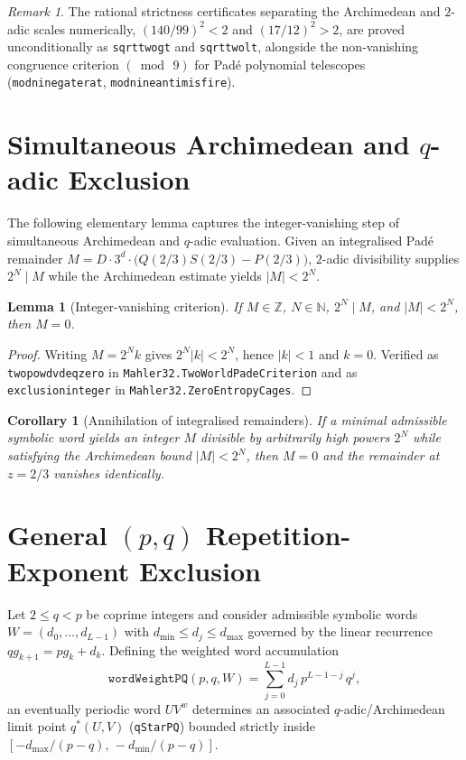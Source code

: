 \documentclass[11pt,a4paper]{article}
\newtheorem{lemma}[theorem]{Lemma}
\newtheorem{corollary}[theorem]{Corollary}
\theoremstyle{remark}
\newtheorem{remark}[theorem]{Remark}
\newcommand{\Z}{\mathbb{Z}}
\newcommand{\N}{\mathbb{N}}
\renewcommand{\_}{\textunderscore\allowbreak}
\newcommand{\lean}[1]{\texttt{#1}}
\begin{document}
\begin{remark}
The rational strictness certificates separating the Archimedean and $2$-adic scales numerically, $(140/99)^2<2$ and $(17/12)^2>2$, are proved unconditionally as \lean{sqrt\_two\_gt\_140\_99} and \lean{sqrt\_two\_lt\_17\_12}, alongside the non-vanishing congruence criterion $(\bmod\,9)$ for Pad\'e polynomial telescopes (\lean{mod\_nine\_gate\_rat}, \lean{mod\_nine\_anti\_misfire}).
\end{remark}

\section{Simultaneous Archimedean and \texorpdfstring{$q$}{q}-adic Exclusion}
\label{sec:engine}

The following elementary lemma captures the integer-vanishing step of simultaneous Archimedean and $q$-adic evaluation. Given an integralised Pad\'e remainder $M=D\cdot 3^{d}\cdot\bigl(Q(2/3)S(2/3)-P(2/3)\bigr)$, $2$-adic divisibility supplies $2^{N}\mid M$ while the Archimedean estimate yields $|M|<2^{N}$.

\begin{lemma}[Integer-vanishing criterion]
\label{lem:engine}
If $M\in\Z$, $N\in\N$, $2^{N}\mid M$, and $|M|<2^{N}$, then $M=0$.
\end{lemma}

\begin{proof}
Writing $M=2^{N}k$ gives $2^{N}|k|<2^{N}$, hence $|k|<1$ and $k=0$. Verified as \lean{two\_pow\_dvd\_eq\_zero} in \lean{Mahler32.\allowbreak TwoWorldPadeCriterion} and as \lean{exclusion\_integer} in \lean{Mahler32.\allowbreak ZeroEntropyCages}.
\end{proof}

\begin{corollary}[Annihilation of integralised remainders]
If a minimal admissible symbolic word yields an integer $M$ divisible by arbitrarily high powers $2^N$ while satisfying the Archimedean bound $|M|<2^N$, then $M=0$ and the remainder at $z=2/3$ vanishes identically.
\end{corollary}

\section{General \texorpdfstring{$(p,q)$}{(p,q)} Repetition-Exponent Exclusion}
\label{sec:pqbound}

Let $2\le q<p$ be coprime integers and consider admissible symbolic words $W=(d_0,\dots,d_{L-1})$ with $d_{\min}\le d_j\le d_{\max}$ governed by the linear recurrence $q g_{k+1}=p g_k+d_k$. Defining the weighted word accumulation
\[
  \lean{wordWeightPQ}(p,q,W)=\sum_{j=0}^{L-1} d_j\,p^{L-1-j}\,q^j,
\]
an eventually periodic word $U V^w$ determines an associated $q$-adic/Archimedean limit point $q^*(U,V)$ (\lean{qStarPQ}) bounded strictly inside $[-d_{\max}/(p-q),\,-d_{\min}/(p-q)]$.
\end{document}
